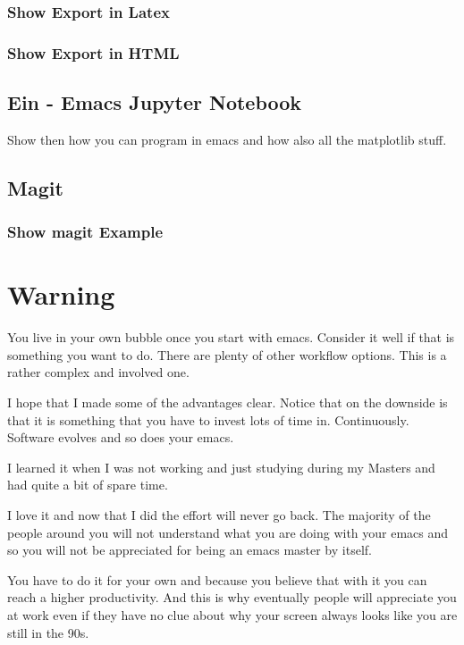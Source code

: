 \documentclass[a4paper]{article}
\begin{document}
\subsubsection{Show Export in Latex}
\label{sec:orge5d9063}

\subsubsection{Show Export in HTML}
\label{sec:org143539c}


\subsection{Ein - Emacs Jupyter Notebook}
\label{sec:orgbcb0dbd}
Show then how you can program in emacs and how also all the
matplotlib stuff.

\subsection{Magit}
\label{sec:orge3da19e}

\subsubsection{Show magit Example}
\label{sec:org6a27536}


\section{Warning}
\label{sec:orgdcb5400}

You live in your own bubble once you start with emacs. Consider it
well if that is something you want to do. There are plenty of other
workflow options. This is a rather complex and involved one.

I hope that I made some of the advantages clear. Notice that on the
downside is that it is something that you have to invest lots of
time in. Continuously. Software evolves and so does your emacs.

I learned it when I was not working and just studying during my
Masters and had quite a bit of spare time.

I love it and now that I did the effort will never go back. The
majority of the people around you will not understand what you are
doing with your emacs and so you will not be appreciated for being
an emacs master by itself.

You have to do it for your own and because you believe that with it
you can reach a higher productivity. And this is why eventually
people will appreciate you at work even if they have no clue about
why your screen always looks like you are still in the 90s.
\end{document}
